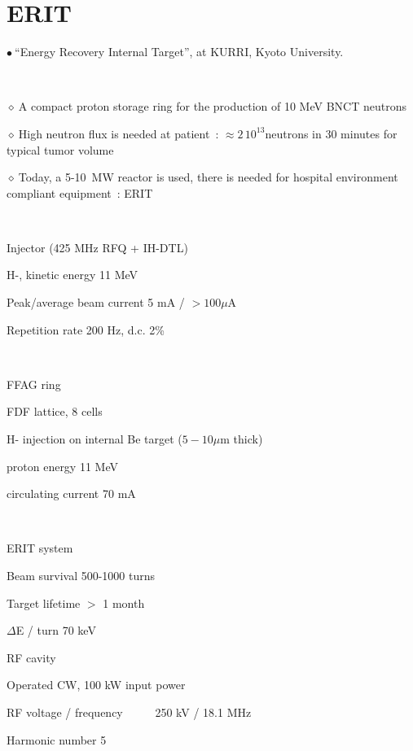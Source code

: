 \documentclass[12pt]{article}
\newcommand{\nib}{\noindent \ensuremath{\bullet~}}
\newcommand{\nid}{\noindent \ensuremath{\diamond~}}
\newcommand{\black}{\color{black}}
\newcommand{\blue}{\color{blue}}
\begin{document}
\clearpage 


\section{\LARGE ERIT}

{\fontsize{16}{20} \selectfont


\nib  ``Energy Recovery Internal Target'',  at KURRI, Kyoto University. 

~

\nid \black A compact proton storage ring for the production  of 10 MeV BNCT neutrons 

\nid \blue High neutron flux is needed at patient~: $\approx 2\, 10^{13}$neutrons in 30 minutes for typical tumor volume

\nid \black Today, a 5-10~MW reactor is used, there is needed for hospital environment compliant equipment~: ERIT

~

\begin{minipage}{.49\linewidth}
\blue Injector (425 MHz RFQ + IH-DTL)

\medskip

\black
H-,  kinetic energy 11 MeV

Peak/average beam current 5 mA / $>100\mu$A

Repetition rate 200 Hz, d.c. 2\%

~

\blue FFAG ring

\medskip

\black
FDF lattice, 8 cells

H- injection on internal Be target ($5-10\mu$m thick)

proton energy 11 MeV

circulating current 70 mA

~

\blue ERIT system

\medskip

\black
Beam survival 500-1000 turns

Target lifetime $>$ 1 month 

$\Delta$E / turn 70 keV
~

\blue RF cavity

\medskip

\black
Operated CW, 100 kW input power

RF voltage / frequency ~ ~ ~ 250 kV / 18.1 MHz

Harmonic number 5
\end{minipage}
\begin{minipage}{.49\linewidth}
\begin{center}


\end{center}
\end{minipage}}
\end{document}
